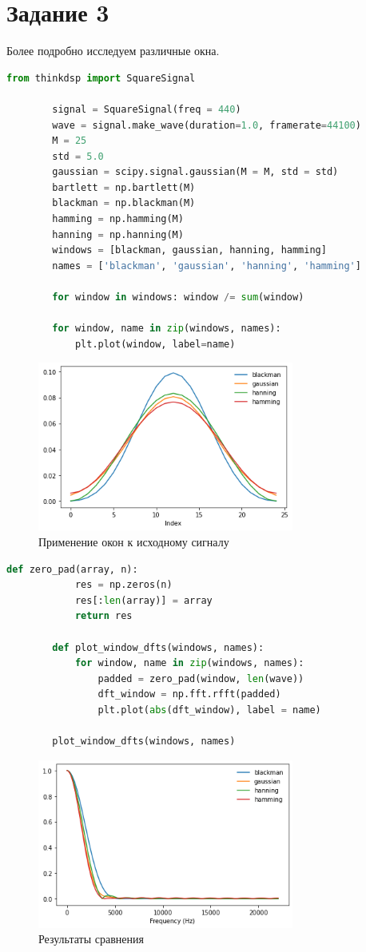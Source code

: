 \documentclass[a4paper, 12pt]{report}
\begin{document}
	\section{Задание 3}
	Более подробно исследуем различные окна.
	\begin{lstlisting}[language=Python,caption=Начало исследования]
		from thinkdsp import SquareSignal

		signal = SquareSignal(freq = 440)
		wave = signal.make_wave(duration=1.0, framerate=44100)
		M = 25
		std = 5.0
		gaussian = scipy.signal.gaussian(M = M, std = std)   
		bartlett = np.bartlett(M)
		blackman = np.blackman(M)
		hamming = np.hamming(M)
		hanning = np.hanning(M)
		windows = [blackman, gaussian, hanning, hamming]
		names = ['blackman', 'gaussian', 'hanning', 'hamming']

		for window in windows: window /= sum(window)

		for window, name in zip(windows, names):
			plt.plot(window, label=name)
	\end{lstlisting}
	\begin{figure}[H]
		\centering
		\includegraphics[width=0.75\textwidth]{task5.png}
		\caption{Применение окон к исходному сигналу}
		\label{fig:task5}
	\end{figure}
	\begin{lstlisting}[language=Python,caption=Применение функции DFT]
		def zero_pad(array, n):
			res = np.zeros(n)
			res[:len(array)] = array
			return res

		def plot_window_dfts(windows, names):
			for window, name in zip(windows, names):
				padded = zero_pad(window, len(wave))
				dft_window = np.fft.rfft(padded)
				plt.plot(abs(dft_window), label = name)

		plot_window_dfts(windows, names)
	\end{lstlisting}
	\begin{figure}[H]
		\centering
		\includegraphics[width=0.75\textwidth]{task6.png}
		\caption{Результаты сравнения}
		\label{fig:task6}
	\end{figure}
\end{document}

